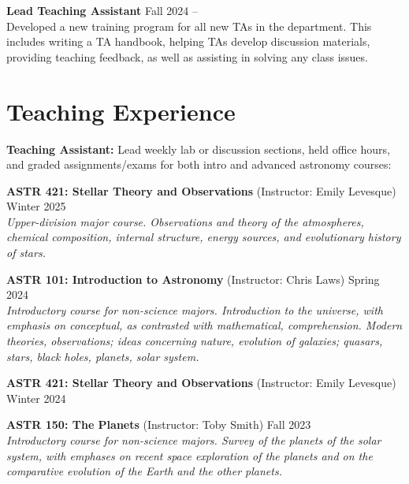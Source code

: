 \documentclass[a4,11pt]{article}
\begin{document}
\textbf{Lead Teaching Assistant} \hfill Fall 2024 -- \\ 
Developed a new training program for all new TAs in the department. This includes writing a TA handbook, helping TAs develop discussion materials, providing teaching feedback, as well as assisting in solving any class issues. 
\vspace{.2cm}


\section{Teaching Experience}

\textbf{Teaching Assistant:} Lead weekly lab or discussion sections, held office hours, and graded assignments/exams for both intro and advanced astronomy courses: \vspace{.3cm} 

\textbf{ASTR 421: Stellar Theory and Observations} (Instructor: Emily Levesque) \hfill Winter 2025 \\
\textsl{Upper-division major course. Observations and theory of the atmospheres, chemical composition, internal structure, energy sources, and evolutionary history of stars.} \vspace{.2cm}

\textbf{ASTR 101: Introduction to Astronomy} (Instructor: Chris Laws) \hfill Spring 2024  \\
\textsl{Introductory course for non-science majors. Introduction to the universe, with emphasis on conceptual, as contrasted with mathematical, comprehension. Modern theories, observations; ideas concerning nature, evolution of galaxies; quasars, stars, black holes, planets, solar system.} \vspace{.2cm}

\textbf{ASTR 421: Stellar Theory and Observations} (Instructor: Emily Levesque) \hfill Winter 2024 \\
\vspace{.2cm}

\textbf{ASTR 150: The Planets} (Instructor: Toby Smith) \hfill Fall 2023  \\
\textsl{Introductory course for non-science majors. Survey of the planets of the solar system, with emphases on recent space exploration of the planets and on the comparative evolution of the Earth and the other planets.} \vspace{.2cm}
\end{document}
